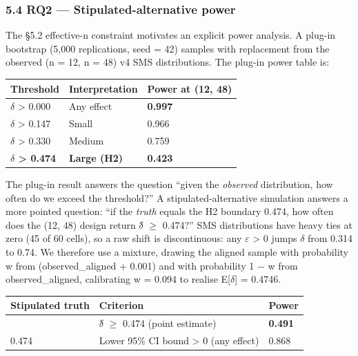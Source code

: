 \documentclass[review,12pt,authoryear]{elsarticle}
\newcounter{none}                   %
\begin{document}
\subsubsection{5.4 RQ2 --- Stipulated-alternative
power}\label{rq2-stipulated-alternative-power}

The §5.2 effective-n constraint motivates an explicit power analysis. A
plug-in bootstrap (5,000 replications, seed = 42) samples with
replacement from the observed (n = 12, n = 48) v4 SMS distributions. The
plug-in power table is:

{\def\LTcaptype{none} %
\begin{longtable}[]{@{}lll@{}}
\toprule\noalign{}
Threshold & Interpretation & Power at (12, 48) \\
\midrule\noalign{}
\endhead
\bottomrule\noalign{}
\endlastfoot
$\delta$ \textgreater{} 0.000 & Any effect & \textbf{0.997} \\
$\delta$ \textgreater{} 0.147 & Small & 0.966 \\
$\delta$ \textgreater{} 0.330 & Medium & 0.759 \\
\textbf{$\delta$ \textgreater{} 0.474} & \textbf{Large (H2)} &
\textbf{0.423} \\
\end{longtable}
}

The plug-in result answers the question ``given the \emph{observed}
distribution, how often do we exceed the threshold?'' A
stipulated-alternative simulation answers a more pointed question: ``if
the \emph{truth} equals the H2 boundary 0.474, how often does the (12,
48) design return $\delta$̂ $\geq$ 0.474?'' SMS distributions have heavy ties at zero
(45 of 60 cells), so a raw shift is discontinuous: any $\varepsilon$ \textgreater{}
0 jumps $\delta$ from 0.314 to 0.74. We therefore use a mixture, drawing the
aligned sample with probability w from (observed\_aligned + 0.001) and
with probability 1 − w from observed\_aligned, calibrating w = 0.094 to
realise E{[}$\delta${]} = 0.4746.

{\def\LTcaptype{none} %
\begin{longtable}[]{@{}lll@{}}
\toprule\noalign{}
Stipulated truth & Criterion & Power \\
\midrule\noalign{}
\endhead
\bottomrule\noalign{}
\endlastfoot
0.474 & $\delta$̂ $\geq$ 0.474 (point estimate) & \textbf{0.491} \\
0.474 & Lower 95\% CI bound \textgreater{} 0 (any effect) & 0.868 \\
\end{longtable}
}
\end{document}
